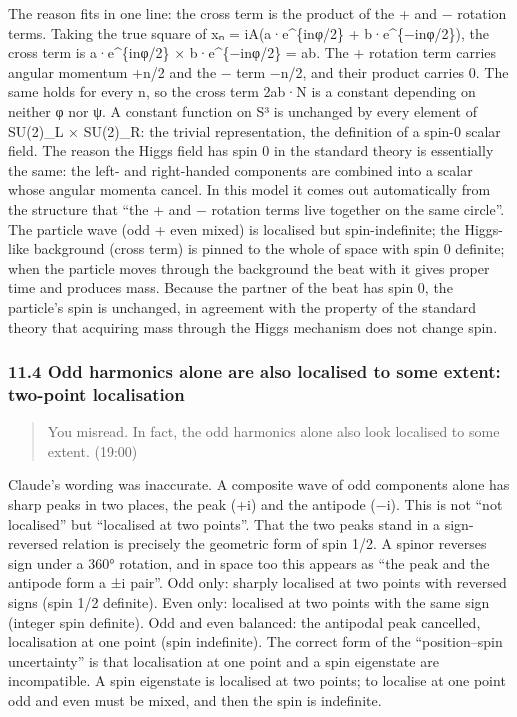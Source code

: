 \documentclass[
  a4paper,
]{article}
\begin{document}
The reason fits in one line: the cross term is the product of the + and
− rotation terms. Taking the true square of xₙ = iA(a·e\^{}\{inφ/2\} +
b·e\^{}\{−inφ/2\}), the cross term is a·e\^{}\{inφ/2\} ×
b·e\^{}\{−inφ/2\} = ab. The + rotation term carries angular momentum
+n/2 and the − term −n/2, and their product carries 0. The same holds
for every n, so the cross term 2ab·N is a constant depending on neither
φ nor ψ. A constant function on S³ is unchanged by every element of
SU(2)\_L × SU(2)\_R: the trivial representation, the definition of a
spin-0 scalar field. The reason the Higgs field has spin 0 in the
standard theory is essentially the same: the left- and right-handed
components are combined into a scalar whose angular momenta cancel. In
this model it comes out automatically from the structure that ``the +
and − rotation terms live together on the same circle''. The particle
wave (odd + even mixed) is localised but spin-indefinite; the Higgs-like
background (cross term) is pinned to the whole of space with spin 0
definite; when the particle moves through the background the beat with
it gives proper time and produces mass. Because the partner of the beat
has spin 0, the particle's spin is unchanged, in agreement with the
property of the standard theory that acquiring mass through the Higgs
mechanism does not change spin.

\subsubsection{11.4 Odd harmonics alone are also localised to some
extent: two-point
localisation}\label{odd-harmonics-alone-are-also-localised-to-some-extent-two-point-localisation}

\begin{quote}
You misread. In fact, the odd harmonics alone also look localised to
some extent. (19:00)
\end{quote}

Claude's wording was inaccurate. A composite wave of odd components
alone has sharp peaks in two places, the peak (+i) and the antipode
(−i). This is not ``not localised'' but ``localised at two points''.
That the two peaks stand in a sign-reversed relation is precisely the
geometric form of spin 1/2. A spinor reverses sign under a 360°
rotation, and in space too this appears as ``the peak and the antipode
form a ±i pair''. Odd only: sharply localised at two points with
reversed signs (spin 1/2 definite). Even only: localised at two points
with the same sign (integer spin definite). Odd and even balanced: the
antipodal peak cancelled, localisation at one point (spin indefinite).
The correct form of the ``position--spin uncertainty'' is that
localisation at one point and a spin eigenstate are incompatible. A spin
eigenstate is localised at two points; to localise at one point odd and
even must be mixed, and then the spin is indefinite.
\end{document}
